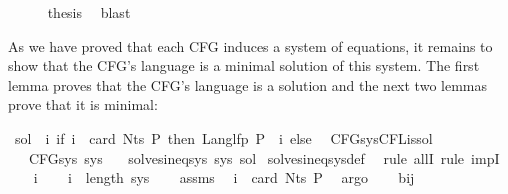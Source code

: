 \begin{isabellebody}
\ \ \ \ \isamarkupfalse%
\ {\isacharquery}{\kern0pt}thesis\ \isamarkupfalse%
\ blast\isanewline
{}\isamarkupfalse%
%
\endisatagproof
{\isafoldproof}%
%
\isadelimproof
%
\endisadelimproof
%
\begin{isamarkuptext}%
As we have proved that each CFG induces a system of  equations, it remains to
show that the  CFG's language is a minimal solution of this system. The first lemma proves that
the CFG's language is a solution and the next two lemmas prove that it is minimal:%
\end{isamarkuptext}\isamarkuptrue%
\isamarkupfalse%
\ {\isachardoublequoteopen}sol\ {\isasymequiv}\ {\isasymlambda}i{\isachardot}{\kern0pt}\ if\ i\ {\isacharless}{\kern0pt}\ card\ {\isacharparenleft}{\kern0pt}Nts\ P{\isacharparenright}{\kern0pt}\ then\ Lang{\isacharunderscore}{\kern0pt}lfp\ P\ {\isacharparenleft}{\kern0pt}{\isasymgamma}\ i{\isacharparenright}{\kern0pt}\ else\ {\isacharbraceleft}{\kern0pt}{\isacharbraceright}{\kern0pt}{\isachardoublequoteclose}\isanewline
\isanewline
{}\isamarkupfalse%
\ CFG{\isacharunderscore}{\kern0pt}sys{\isacharunderscore}{\kern0pt}CFL{\isacharunderscore}{\kern0pt}is{\isacharunderscore}{\kern0pt}sol{\isacharcolon}{\kern0pt}\isanewline
\ \ \ {\isachardoublequoteopen}CFG{\isacharunderscore}{\kern0pt}sys\ sys{\isachardoublequoteclose}\isanewline
\ \ \ {\isachardoublequoteopen}solves{\isacharunderscore}{\kern0pt}ineq{\isacharunderscore}{\kern0pt}sys\ sys\ sol{\isachardoublequoteclose}\isanewline
%
\isadelimproof
%
\endisadelimproof
%
\isatagproof
{}\isamarkupfalse%
\ solves{\isacharunderscore}{\kern0pt}ineq{\isacharunderscore}{\kern0pt}sys{\isacharunderscore}{\kern0pt}def\ \isamarkupfalse%
\ {\isacharparenleft}{\kern0pt}rule\ allI{\isacharcomma}{\kern0pt}\ rule\ impI{\isacharparenright}{\kern0pt}\isanewline
\ \ \isamarkupfalse%
\ i\isanewline
\ \ \isamarkupfalse%
\ {\isachardoublequoteopen}i\ {\isacharless}{\kern0pt}\ length\ sys{\isachardoublequoteclose}\isanewline
\ \ \isamarkupfalse%
\ assms\ \isamarkupfalse%
\ {\isachardoublequoteopen}i\ {\isacharless}{\kern0pt}\ card\ {\isacharparenleft}{\kern0pt}Nts\ P{\isacharparenright}{\kern0pt}{\isachardoublequoteclose}\ \isamarkupfalse%
\ argo\isanewline
\ \ \isamarkupfalse%
\ bij{\isacharunderscore}{\kern0pt}{\isasymgamma}{\isacharunderscore}{\kern0pt}{\isasymgamma}{\isacharprime}{\kern0pt}\ \isamarkupfalse%

\end{isabellebody}
